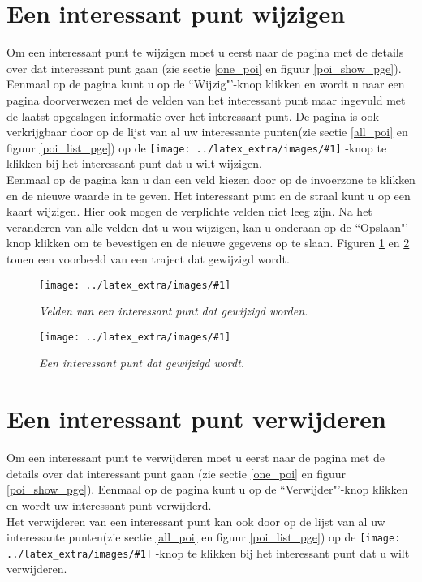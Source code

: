 \documentclass[11pt,twoside,a4paper]{report}
\newcommand*{\copyimageH}[4]{ 			%
	\begin{figure}[Ht]
	\texttt{[image: ../latex\_extra/images/\#1]}
	\caption{\textit{#4}}\label{#2}
	\end{figure}
}
\newcommand*{\copyimageText}[2]{ 			%
	\texttt{[image: ../latex\_extra/images/\#1]}
}
\begin{document}
		\section{Een interessant punt wijzigen}\label{edit_poi}
Om een  interessant punt te wijzigen moet u eerst naar de pagina met de details over dat  interessant punt gaan (zie sectie \ref{one_poi} en figuur \ref{poi_show_pge}). Eenmaal op de pagina kunt u op de ``Wijzig"'-knop klikken en wordt u naar een pagina doorverwezen met de velden van het  interessant punt maar ingevuld met de laatst opgeslagen informatie over het  interessant punt. De pagina is ook verkrijgbaar door op de lijst van al uw interessante punten(zie sectie \ref{all_poi} en figuur \ref{poi_list_pge}) op de \copyimageText{edit_route_btn.jpg}{1em}-knop te klikken bij het interessant punt dat u wilt wijzigen.\\
Eenmaal op de pagina kan u dan een veld kiezen door op de invoerzone te klikken en de nieuwe waarde in te geven. Het  interessant punt en de straal kunt u op een kaart wijzigen. Hier ook mogen de verplichte velden \footnotemark[2] niet leeg zijn. Na het veranderen van alle velden dat u wou wijzigen, kan u onderaan op de ``Opslaan"'-knop klikken om te bevestigen en de nieuwe gegevens op te slaan. Figuren \ref{poi_edit_1_pge} en \ref{poi_edit_2_pge} tonen een voorbeeld van een traject dat gewijzigd wordt.
\copyimageH{poi_edit.jpg}{poi_edit_1_pge}{\textwidth}{Velden van een  interessant punt dat gewijzigd worden.}
\copyimageH{poi_edit_2.jpg}{poi_edit_2_pge}{\textwidth}{Een  interessant punt dat gewijzigd wordt.}


		\section{Een interessant punt verwijderen}\label{delete_poi}
Om een  interessant punt te verwijderen moet u eerst naar de pagina met de details over dat  interessant punt gaan (zie sectie \ref{one_poi} en figuur \ref{poi_show_pge}). Eenmaal op de pagina kunt u op de ``Verwijder"'-knop klikken en wordt uw interessant punt verwijderd.\\
 Het verwijderen van een interessant punt kan ook door op de lijst van al uw interessante punten(zie sectie \ref{all_poi} en figuur \ref{poi_list_pge}) op de \copyimageText{delete_poi_btn.jpg}{1em}-knop te klikken bij het interessant punt dat u wilt verwijderen.\\

\end{document}
